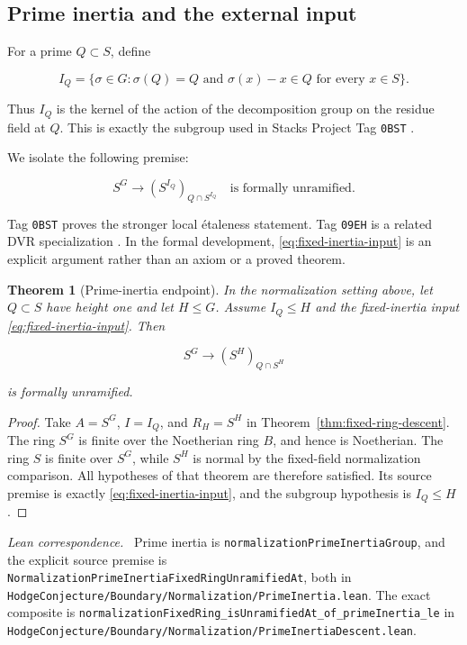 \documentclass[11pt]{article}
\newtheorem{theorem}{Theorem}[section]
\theoremstyle{remark}
\newcommand{\leanpath}[1]{\texttt{\nolinkurl{#1}}}
\newcommand{\leansrc}[1]{%
  \leanpath{HodgeConjecture/Boundary/Normalization/#1}}
\newenvironment{leanfiles}
  {\par\medskip\begingroup\footnotesize\raggedright\noindent
   \textit{Lean correspondence.}\ }
  {\par\endgroup\medskip}
\begin{document}
\subsection{Prime inertia and the external input}
\label{subsec:prime-inertia}

For a prime \(Q\subset S\), define

\[
  I_Q=
  \{\sigma\in G:
    \sigma(Q)=Q\text{ and }
    \sigma(x)-x\in Q\text{ for every }x\in S\}.
\]

Thus \(I_Q\) is the kernel of the action of the decomposition group on the
residue field at \(Q\).  This is exactly the subgroup used in Stacks
Project Tag \texttt{0BST} \cite{StacksPrimeInertiaEtale}.

We isolate the following premise:

\begin{equation}
\label{eq:fixed-inertia-input}
  S^G\longrightarrow
  (S^{I_Q})_{Q\cap S^{I_Q}}
  \quad\text{is formally unramified.}
\end{equation}

Tag \texttt{0BST} proves the stronger local
\'etaleness statement.  Tag \texttt{09EH} is a related DVR
specialization \cite{StacksDVRInertiaEtale}.  In the formal development,
\eqref{eq:fixed-inertia-input} is an explicit argument rather than an
axiom or a proved theorem.

\begin{theorem}[Prime-inertia endpoint]
\label{thm:prime-inertia-endpoint}
In the normalization setting above, let \(Q\subset S\) have height one and
let \(H\leq G\).  Assume \(I_Q\leq H\) and the fixed-inertia input
\eqref{eq:fixed-inertia-input}.  Then

\[
  S^G\longrightarrow (S^H)_{Q\cap S^H}
\]

is formally unramified.
\end{theorem}

\begin{proof}
Take \(A=S^G\), \(I=I_Q\), and \(R_H=S^H\) in
Theorem~\ref{thm:fixed-ring-descent}.  The ring \(S^G\) is finite over the
Noetherian ring \(B\), and hence is Noetherian.  The ring \(S\) is finite
over \(S^G\), while \(S^H\) is normal by the fixed-field normalization
comparison.  All hypotheses of that theorem are therefore satisfied.
Its source premise is exactly \eqref{eq:fixed-inertia-input}, and the
subgroup hypothesis is \(I_Q\leq H\).
\end{proof}

\begin{leanfiles}
Prime inertia is
\leanpath{normalizationPrimeInertiaGroup}, and the explicit source premise
is \leanpath{NormalizationPrimeInertiaFixedRingUnramifiedAt}, both in
\leansrc{PrimeInertia.lean}.
The exact composite is
\leanpath{normalizationFixedRing_isUnramifiedAt_of_primeInertia_le} in
\leansrc{PrimeInertiaDescent.lean}.
\end{leanfiles}
\end{document}

